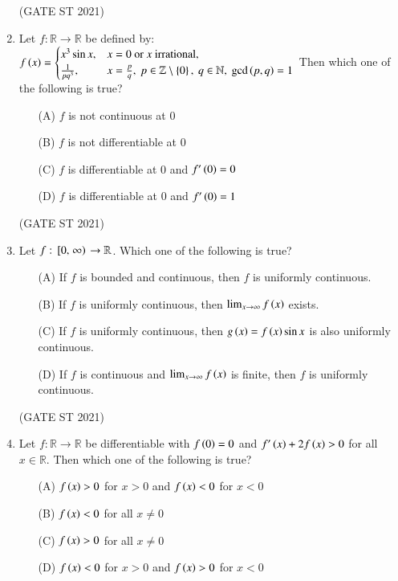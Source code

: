 \documentclass[journal,12pt,onecolumn]{IEEEtran}
\theoremstyle{remark}
\begin{document}
\begin{enumerate}
\hfill (GATE ST 2021) \\


\item
Let $f: \mathbb{R} \to \mathbb{R}$ be defined by:
$
f\left(x\right) =
\begin{cases}
x^3 \sin x, & x = 0 \ \text{or $x$ irrational}, \\
\frac{1}{p q^3}, & x = \frac{p}{q}, \ p \in \mathbb{Z} \setminus \left\{0\right\}, \ q \in \mathbb{N}, \ \gcd\left(p,q\right) = 1
\end{cases}
$
Then which one of the following is true?
\begin{enumerate}
\item[(A)] $f$ is not continuous at $0$
\item[(B)] $f$ is not differentiable at $0$
\item[(C)] $f$ is differentiable at $0$ and $f'\left(0\right) = 0$
\item[(D)] $f$ is differentiable at $0$ and $f'\left(0\right) = 1$
\end{enumerate}

\hfill (GATE ST 2021) \\

\item
Let $f: {}\left[0, \left.\infty\right)\right. \to \mathbb{R}$. Which one of the following is true?
\begin{enumerate}
\item[(A)] If $f$ is bounded and continuous, then $f$ is uniformly continuous.
\item[(B)] If $f$ is uniformly continuous, then $\lim_{x \to \infty} f\left(x\right)$ exists.
\item[(C)] If $f$ is uniformly continuous, then $g\left(x\right) = f\left(x\right) \sin x$ is also uniformly continuous.
\item[(D)] If $f$ is continuous and $\lim_{x \to \infty} f\left(x\right)$ is finite, then $f$ is uniformly continuous.
\end{enumerate}

\hfill (GATE ST 2021) \\
\item
Let $f: \mathbb{R} \to \mathbb{R}$ be differentiable with $f\left(0\right) = 0$ and $f'\left(x\right) + 2f\left(x\right) > 0$ for all $x \in \mathbb{R}$. Then which one of the following is true?
\begin{enumerate}
\item[(A)] $f\left(x\right) > 0$ for $x > 0$ and $f\left(x\right) < 0$ for $x < 0$
\item[(B)] $f\left(x \right)< 0$ for all $x \neq 0$
\item[(C)] $f\left(x\right) > 0$ for all $x \neq 0$
\item[(D)] $f\left(x\right) < 0$ for $x > 0$ and $f\left(x\right) > 0$ for $x < 0$
\end{enumerate}


\end{enumerate}
\end{document}
